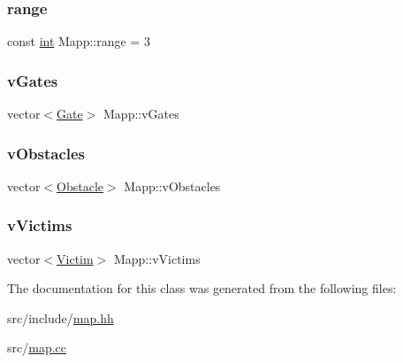 \mbox{\label{class_mapp_a849c2e12fc303e4f35e39602a86bbca7}} 
\subsubsection{\texorpdfstring{range}{range}}
{\footnotesize\ttfamily const \mbox{\hyperlink{draw_8hh_aa620a13339ac3a1177c86edc549fda9b}{int}} Mapp\+::range = 3\hspace{0.3cm}{\ttfamily [protected]}}

\mbox{\label{class_mapp_ad33044227affb6fc91f1a795ca3fab4a}} 
\subsubsection{\texorpdfstring{vGates}{vGates}}
{\footnotesize\ttfamily vector$<$\mbox{\hyperlink{class_gate}{Gate}}$>$ Mapp\+::v\+Gates\hspace{0.3cm}{\ttfamily [protected]}}

\mbox{\label{class_mapp_adfc09e7e4750c47c7a3d2fe2f30241f8}} 
\subsubsection{\texorpdfstring{vObstacles}{vObstacles}}
{\footnotesize\ttfamily vector$<$\mbox{\hyperlink{class_obstacle}{Obstacle}}$>$ Mapp\+::v\+Obstacles\hspace{0.3cm}{\ttfamily [protected]}}

\mbox{\label{class_mapp_a3cd9951fd2f55c83de0c9441249b79db}} 
\subsubsection{\texorpdfstring{vVictims}{vVictims}}
{\footnotesize\ttfamily vector$<$\mbox{\hyperlink{class_victim}{Victim}}$>$ Mapp\+::v\+Victims\hspace{0.3cm}{\ttfamily [protected]}}



The documentation for this class was generated from the following files\+:\begin{DoxyCompactItemize}
\item 
src/include/\mbox{\hyperlink{map_8hh}{map.\+hh}}\item 
src/\mbox{\hyperlink{map_8cc}{map.\+cc}}\end{DoxyCompactItemize}
